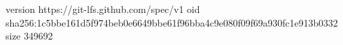 version https://git-lfs.github.com/spec/v1
oid sha256:1c5bbe161d5f974beb0e6649bbe61f96bba4c9e080f09f69a930fc1e913b0332
size 349692

